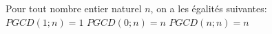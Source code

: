 
Pour tout nombre entier naturel $n$, on a les égalités suivantes: \\
$PGCD(1;n)=1$ \hspace{1cm} $PGCD(0;n)=n$ \hspace{1cm}
$PGCD(n;n)=n$ \hspace{1cm}